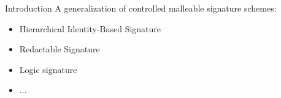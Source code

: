 \begin{frame}{Introduction}
  A generalization of controlled malleable signature schemes:
  \begin{itemize}
  \item Hierarchical Identity-Based Signature
  \item Redactable Signature
  \item Logic signature
  \item $\dots$
  \end{itemize}
\end{frame}
